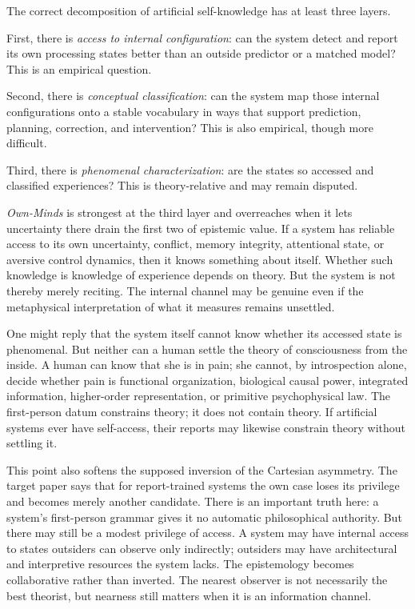 \documentclass[11pt]{article}
\begin{document}
The correct decomposition of artificial self-knowledge has at least three layers.

First, there is \textit{access to internal configuration}: can the system detect and report its own processing states better than an outside predictor or a matched model? This is an empirical question.

Second, there is \textit{conceptual classification}: can the system map those internal configurations onto a stable vocabulary in ways that support prediction, planning, correction, and intervention? This is also empirical, though more difficult.

Third, there is \textit{phenomenal characterization}: are the states so accessed and classified experiences? This is theory-relative and may remain disputed.

\textit{Own-Minds} is strongest at the third layer and overreaches when it lets uncertainty there drain the first two of epistemic value. If a system has reliable access to its own uncertainty, conflict, memory integrity, attentional state, or aversive control dynamics, then it knows something about itself. Whether such knowledge is knowledge of experience depends on theory. But the system is not thereby merely reciting. The internal channel may be genuine even if the metaphysical interpretation of what it measures remains unsettled.

One might reply that the system itself cannot know whether its accessed state is phenomenal. But neither can a human settle the theory of consciousness from the inside. A human can know that she is in pain; she cannot, by introspection alone, decide whether pain is functional organization, biological causal power, integrated information, higher-order representation, or primitive psychophysical law. The first-person datum constrains theory; it does not contain theory. If artificial systems ever have self-access, their reports may likewise constrain theory without settling it.

This point also softens the supposed inversion of the Cartesian asymmetry. The target paper says that for report-trained systems the own case loses its privilege and becomes merely another candidate. There is an important truth here: a system's first-person grammar gives it no automatic philosophical authority. But there may still be a modest privilege of access. A system may have internal access to states outsiders can observe only indirectly; outsiders may have architectural and interpretive resources the system lacks. The epistemology becomes collaborative rather than inverted. The nearest observer is not necessarily the best theorist, but nearness still matters when it is an information channel.
\end{document}
